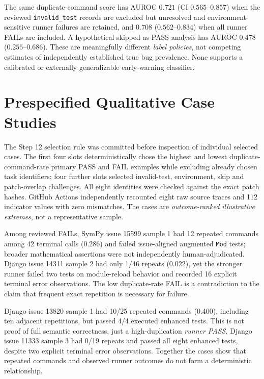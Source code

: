 \documentclass[journal]{IEEEtran}
\begin{document}
The same duplicate-command score has AUROC $0.721$ (CI $0.565$--$0.857$) when the reviewed \texttt{invalid\_test} records are excluded but unresolved and environment-sensitive runner failures are retained, and $0.708$ ($0.562$--$0.834$) when all runner FAILs are included. A hypothetical skipped-as-PASS analysis has AUROC $0.478$ ($0.255$--$0.686$). These are meaningfully different \emph{label policies}, not competing estimates of independently established true bug prevalence. None supports a calibrated or externally generalizable early-warning classifier.



\section{Prespecified Qualitative Case Studies}
The Step 12 selection rule was committed before inspection of individual selected cases. The first four slots deterministically chose the highest and lowest duplicate-command-rate primary PASS and FAIL examples while excluding already chosen task identifiers; four further slots selected invalid-test, environment, skip and patch-overlap challenges. All eight identities were checked against the exact patch hashes. GitHub Actions independently recounted eight raw source traces and 112 indicator values with zero mismatches. The cases are \emph{outcome-ranked illustrative extremes}, not a representative sample.

Among reviewed FAILs, SymPy issue 15599 sample 1 had 12 repeated commands among 42 terminal calls (0.286) and failed issue-aligned augmented \texttt{Mod} tests; broader mathematical assertions were not independently human-adjudicated. Django issue 14311 sample 2 had only 1/46 repeats (0.022), yet the stronger runner failed two tests on module-reload behavior and recorded 16 explicit terminal error observations. The low duplicate-rate FAIL is a contradiction to the claim that frequent exact repetition is necessary for failure.

Django issue 13820 sample 1 had 10/25 repeated commands (0.400), including ten adjacent repetitions, but passed 4/4 executed enhanced tests. This is not proof of full semantic correctness, just a high-duplication \emph{runner PASS}. Django issue 11333 sample 3 had 0/19 repeats and passed all eight enhanced tests, despite two explicit terminal error observations. Together the cases show that repeated commands and observed runner outcomes do not form a deterministic relationship.
\end{document}
